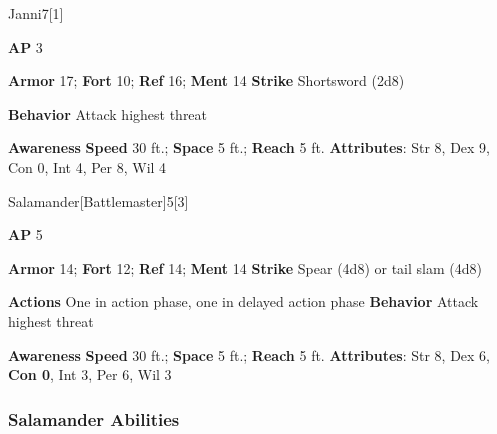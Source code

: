 \begin{monsection}{Janni}{7}[1]
\vspace{-1em}\vspace{-1em}
\begin{spellcontent}
\begin{spelltargetinginfo}
{\textbf{AP} 3}

\pari \textbf{Armor} 17;
\textbf{Fort} 10;
\textbf{Ref} 16;
\textbf{Ment} 14
\pari \textbf{Strike} Shortsword  (2d8)



\pari \textbf{Behavior} Attack highest threat
\end{spelltargetinginfo}
\end{spellcontent}

\begin{monsterfooter}
\pari \textbf{Awareness} 
\pari \textbf{Speed} 30 ft.;
\textbf{Space} 5 ft.;
\textbf{Reach} 5 ft.
\pari \textbf{Attributes}:
Str 8,
Dex 9,
Con 0,
Int 4,
Per 8,
Wil 4
\end{monsterfooter}
\end{monsection}

\begin{monsection}{Salamander}[Battlemaster]{5}[3]
\vspace{-1em}\vspace{-1em}
\begin{spellcontent}
\begin{spelltargetinginfo}
{\textbf{AP} 5}

\pari \textbf{Armor} 14;
\textbf{Fort} 12;
\textbf{Ref} 14;
\textbf{Ment} 14
\pari \textbf{Strike} Spear  (4d8) or tail slam  (4d8)


\pari \textbf{Actions} One in action phase, one in delayed action phase
\pari \textbf{Behavior} Attack highest threat
\end{spelltargetinginfo}
\end{spellcontent}

\begin{monsterfooter}
\pari \textbf{Awareness} 
\pari \textbf{Speed} 30 ft.;
\textbf{Space} 5 ft.;
\textbf{Reach} 5 ft.
\pari \textbf{Attributes}:
Str 8,
Dex 6,
\textbf{Con 0},
Int 3,
Per 6,
Wil 3
\end{monsterfooter}
\end{monsection}


\subsubsection{Salamander Abilities}

